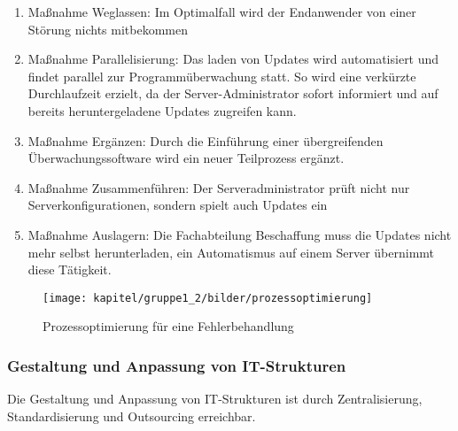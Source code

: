 \begin{enumerate}
    \item Maßnahme Weglassen: Im Optimalfall wird der Endanwender von einer Störung nichts mitbekommen
    \item Maßnahme Parallelisierung: Das laden von Updates wird automatisiert und findet parallel zur Programmüberwachung statt. So wird eine verkürzte Durchlaufzeit erzielt, da der Server-Administrator sofort informiert und auf bereits heruntergeladene Updates zugreifen kann.
    \item Maßnahme Ergänzen: Durch die Einführung einer übergreifenden Überwachungssoftware wird ein neuer Teilprozess ergänzt.
    \item Maßnahme Zusammenführen: Der Serveradministrator prüft nicht nur Serverkonfigurationen, sondern spielt auch Updates ein
    \item Maßnahme Auslagern: Die Fachabteilung Beschaffung muss die Updates nicht mehr selbst herunterladen, ein Automatismus auf einem Server übernimmt diese Tätigkeit.
\end{enumerate}


\begin{figure}[h!]
	\centering
	\texttt{[image: kapitel/gruppe1\_2/bilder/prozessoptimierung]} 
	\caption{Prozessoptimierung für eine Fehlerbehandlung}
	\label{fig_prozessoptimierung}
\end{figure}


\subsubsection{Gestaltung und Anpassung von IT-Strukturen}
\label{subsubsection_gestaltung_IT_strukturen}
Die Gestaltung und Anpassung von IT-Strukturen ist durch Zentralisierung, Standardisierung und Outsourcing erreichbar.


